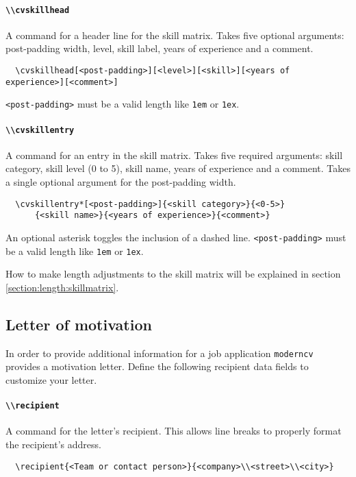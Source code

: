 \documentclass[a4paper, 11pt]{article}
\newcommand{\code}[1]{\lstinline!#1!}
\newcommand{\moderncv}{\code{moderncv}}
\begin{document}
\paragraph{\code{\\cvskillhead}}
A command for a header line for the skill matrix.
Takes five optional arguments: post-padding width, level, skill label, years of experience and a comment.
\begin{lstlisting}
  \cvskillhead[<post-padding>][<level>][<skill>][<years of experience>][<comment>]
\end{lstlisting}
\code{<post-padding>} must be a valid length like \code{1em} or \code{1ex}.

\paragraph{\code{\\cvskillentry}}
A command for an entry in the skill matrix.
Takes five required arguments: skill category, skill level (0 to 5), skill name, years of experience and a comment.
Takes a single optional argument for the post-padding width.
\begin{lstlisting}
  \cvskillentry*[<post-padding>]{<skill category>}{<0-5>}
      {<skill name>}{<years of experience>}{<comment>}
\end{lstlisting}
An optional asterisk toggles the inclusion of a dashed line.
\code{<post-padding>} must be a valid length like \code{1em} or \code{1ex}.

How to make length adjustments to the skill matrix will be explained in section \ref{section:length:skillmatrix}.

\subsection{Letter of motivation}

In order to provide additional information for a job application {\moderncv} provides a motivation letter.\newline
Define the following recipient data fields to customize your letter.
\paragraph{\code{\\recipient}}
A command for the letter's recipient. This allows line breaks to properly format the recipient's address.
\begin{lstlisting}
  \recipient{<Team or contact person>}{<company>\\<street>\\<city>}
\end{lstlisting}
\end{document}
